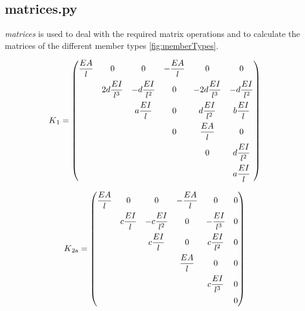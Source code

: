 \subsection{matrices.py}
\label{subsec:matrices.py}

\textit{matrices} is used to deal with the required matrix operations and to calculate the matrices of the different member types \ref{fig:memberTypes}.

\begin{equation} \label{K1}
K\textsubscript{1} = \begin{pmatrix}
\dfrac{EA}{l} & 0                   & 0                   & -\dfrac{EA}{l}  & 0                   & 0                   \\[0.8em]
              & 2d\dfrac{EI}{l^3}   & -d\dfrac{EI}{l^2}   & 0               & -2d\dfrac{EI}{l^3}  & -d\dfrac{EI}{l^2}   \\[0.8em]
              &                     & a\dfrac{EI}{l}      & 0               & d\dfrac{EI}{l^2}    & b\dfrac{EI}{l}      \\[0.8em]
              &                     &                     & 0               & \dfrac{EA}{l}       & 0                   \\[0.8em]
              &                     &                     &                 & 0                   & d\dfrac{EI}{l^2}    \\[0.8em]
              &                     &                     &                 &                     & a\dfrac{EI}{l}
     \end{pmatrix}
\end{equation}

\begin{equation} \label{K2a}
K\textsubscript{2a} = \begin{pmatrix}
\dfrac{EA}{l} & 0                   & 0                   & -\dfrac{EA}{l}  & 0                   & 0                   \\[0.8em]
              & c\dfrac{EI}{l}      & -c\dfrac{EI}{l^2}   & 0               & -\dfrac{EI}{l^3}    & 0                   \\[0.8em]
              &                     & c\dfrac{EI}{l}      & 0               & c\dfrac{EI}{l^2}    & 0                   \\[0.8em]
              &                     &                     & \dfrac{EA}{l}   & 0                   & 0                   \\[0.8em]
              &                     &                     &                 & c\dfrac{EI}{l^3}    & 0                   \\[0.8em]
              &                     &                     &                 &                     & 0
     \end{pmatrix}
\end{equation}

